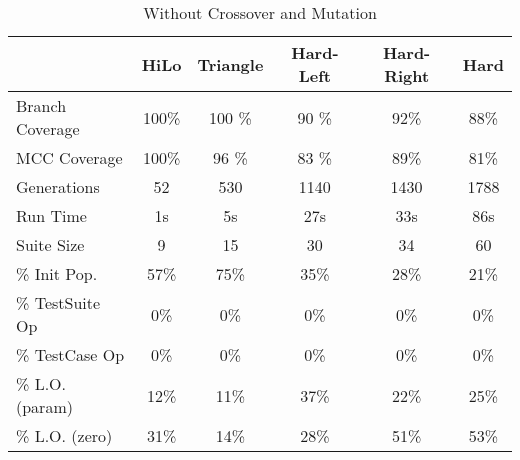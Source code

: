 \documentclass[runningheads]{llncs}
\begin{document}
\begin{table}[h!]
	\begin{center}
		
		\def\arraystretch{1.2}%
		\setlength\tabcolsep{1em}
		\begin{tabular}{| l | c  c  c  c c |}
			\hline
						     & HiLo  		 & Triangle		& Hard-Left	& 	Hard-Right 		& Hard		\\ \hline
			Branch Coverage	 & 100\%         & 100	\%      & 90 \%      	& 92\%          & 88\%      \\ \hline
			MCC Coverage	 & 100\%         & 96 \%        & 83 \%      	& 89\%          & 81\%      \\ \hline
			Generations		 & 52          	 & 530          & 1140       	& 1430          & 1788      \\ \hline
			Run Time		 & 1s          	 & 5s           & 27s       	& 33s          	& 86s       \\ \hhline{|=|=====|}
																
			Suite Size       & 9        	& 15       	 	& 30			& 34          	& 60        \\ \hline
			\% Init Pop.     & 57\%         & 75\%       	& 35\%       	& 28\%         	& 21\%      \\ \hline
			\% TestSuite Op  & 0\%          & 0\%       	& 0\%			& 0\%          	& 0\%       \\ \hline
			\% TestCase  Op  & 0\%          & 0\%       	& 0\%      		& 0\%         	& 0\%       \\ \hline
			\% 	L.O. (param) & 12\%         & 11\%       	& 37\%       	& 22\%          & 25\%      \\ \hline
			\% L.O. (zero)	 & 31\%         & 14\%      	& 28\%       	& 51\%          & 53\%      \\ \hline
		\end{tabular}
	\end{center}
	\caption{Without Crossover and Mutation}  
	\label{tab:noGA}
\end{table}
\end{document}

